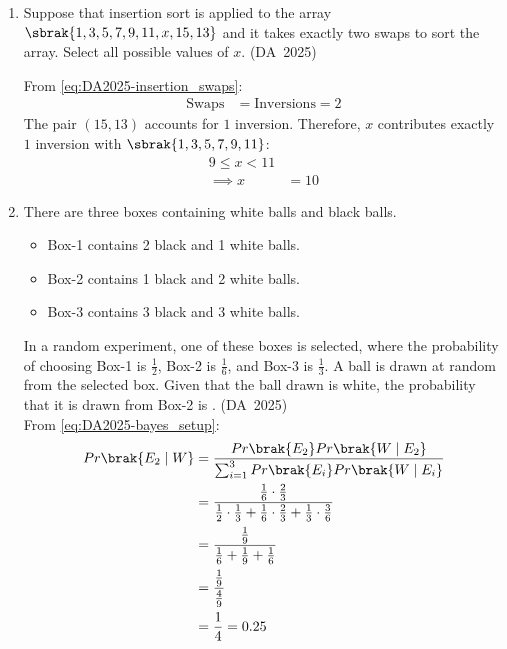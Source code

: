 \begin{enumerate}[label=\thesubsection.\arabic*, ref=\thesubsection.\theenumi]
	\item 
	Suppose that insertion sort is applied to the array $\sbrak{1, 3, 5, 7, 9, 11, x, 15, 13}$ and it takes exactly two swaps to sort the array. Select all possible values of $x$.
	\hfill (DA~2025)
	\begin{enumerate}
	\end{enumerate}
	\solution
	From \eqref{eq:DA2025-insertion_swaps}:
	\begin{align}
		\text{Swaps} &= \text{Inversions} = 2
	\end{align}
	The pair $(15, 13)$ accounts for $1$ inversion. Therefore, $x$ contributes exactly $1$ inversion with $\sbrak{1, 3, 5, 7, 9, 11}$:
	\begin{align}
		9 \le x < 11
		\\
		\implies x &= 10
	\end{align}
	
	\item 
	There are three boxes containing white balls and black balls.
	\begin{itemize}
		\item Box-1 contains 2 black and 1 white balls.
		\item Box-2 contains 1 black and 2 white balls.
		\item Box-3 contains 3 black and 3 white balls.
	\end{itemize}
	In a random experiment, one of these boxes is selected, where the probability of choosing Box-1 is $\frac{1}{2}$, Box-2 is $\frac{1}{6}$, and Box-3 is $\frac{1}{3}$. A ball is drawn at random from the selected box. Given that the ball drawn is white, the probability that it is drawn from Box-2 is \underline{\hspace{1.5cm}}.
	\hfill (DA~2025)
	\\
	\solution
	From \eqref{eq:DA2025-bayes_setup}:
	\begin{align}
		Pr\brak{E_2 \mid W} &= \frac{Pr\brak{E_2}Pr\brak{W \mid E_2}}{\sum_{i=1}^3 Pr\brak{E_i}Pr\brak{W \mid E_i}}
		\\
		&= \frac{\frac{1}{6} \cdot \frac{2}{3}}{\frac{1}{2} \cdot \frac{1}{3} + \frac{1}{6} \cdot \frac{2}{3} + \frac{1}{3} \cdot \frac{3}{6}}
		\\
		&= \frac{\frac{1}{9}}{\frac{1}{6} + \frac{1}{9} + \frac{1}{6}}
		\\
		&= \frac{\frac{1}{9}}{\frac{4}{9}}
		\\
		&= \frac{1}{4} = 0.25
	\end{align}
	

\end{enumerate}
